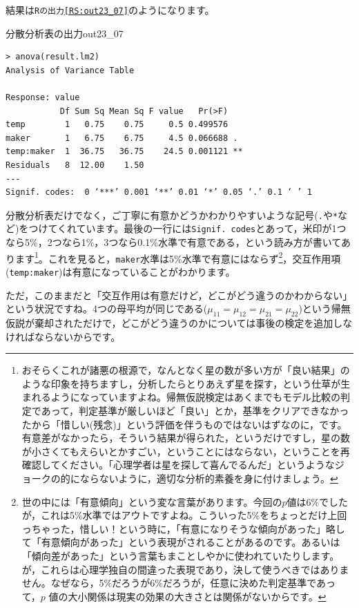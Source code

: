 \documentclass{ltjbook}
\begin{document}
結果は\texttt{Rの出力\ref{RS:out23_07}}のようになります。
\begin{Rscreen}{分散分析表の出力}{out23_07}
	\begin{verbatim}
> anova(result.lm2)
Analysis of Variance Table

Response: value
           Df Sum Sq Mean Sq F value   Pr(>F)   
temp        1   0.75    0.75     0.5 0.499576   
maker       1   6.75    6.75     4.5 0.066688 . 
temp:maker  1  36.75   36.75    24.5 0.001121 **
Residuals   8  12.00    1.50                    
---
Signif. codes:  0 ‘***’ 0.001 ‘**’ 0.01 ‘*’ 0.05 ‘.’ 0.1 ‘ ’ 1
\end{verbatim}
\end{Rscreen}
分散分析表だけでなく，ご丁寧に有意かどうかわかりやすいような記号(\verb|.|や\verb|*|など)をつけてくれています。最後の一行には\texttt{Signif. codes}とあって，米印が1つなら5\%，2つなら1\%，3つなら0.1\%水準で有意である，という読み方が書いてあります\footnote{おそらくこれが諸悪の根源で，なんとなく星の数が多い方が「良い結果」のような印象を持ちますし，分析したらとりあえず星を探す，という仕草が生まれるようになっていますよね。帰無仮説検定はあくまでもモデル比較の判定であって，判定基準が厳しいほど「良い」とか，基準をクリアできなかったから「惜しい(残念)」という評価を伴うものではないはずなのに，です。有意差がなかったら，そういう結果が得られた，というだけですし，星の数が小さくてもえらいとかすごい，ということにはならない，ということを再確認してください。「心理学者は星を探して喜んでるんだ」というようなジョークの的にならないように，適切な分析的素養を身に付けましょう。}。これを見ると，\texttt{maker}水準は5\%水準で有意にはならず\footnote{世の中には「有意傾向」という変な言葉があります。今回の$p$値は6\%でしたが，これは5\%水準ではアウトですよね。こういった5\%をちょっとだけ上回っちゃった，惜しい！という時に，「有意になりそうな傾向があった」略して「有意傾向があった」という表現がされることがあるのです。あるいは「傾向差があった」という言葉もまことしやかに使われていたりします。が，これらは心理学独自の間違った表現であり，決して使うべきではありません。なぜなら，5\%だろうが6\%だろうが，任意に決めた判定基準であって，$p$ 値の大小関係は現実の効果の大きさとは関係がないからです。}，交互作用項(\texttt{temp:maker})は有意になっていることがわかります。

ただ，このままだと「交互作用は有意だけど，どこがどう違うのかわからない」という状況ですね。4つの母平均が同じである($\mu_{11}=\mu_{12}=\mu_{21}=\mu_{22}$)という帰無仮説が棄却されただけで，どこがどう違うのかについては事後の検定を追加しなければならないからです。
\end{document}
